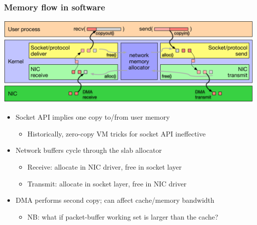 \begin{frame}
  \frametitle{Memory flow in software}

  \begin{center}
    \includegraphics[width=\textwidth]{../../figures/network-memory-flow.pdf}
  \end{center}

  \pause

  \begin{itemize}
    \item Socket API implies one copy to/from user memory
    \begin{itemize}
      \item Historically, zero-copy VM tricks for socket API ineffective
    \end{itemize}

    \pause

    \item Network buffers cycle through the slab allocator
    \begin{itemize}
      \item Receive: allocate in NIC driver, free in socket layer
      \item Transmit: allocate in socket layer, free in NIC driver
    \end{itemize}

    \pause

    \item DMA performs second copy; can affect cache/memory bandwidth
    \begin{itemize}
      \item NB: what if packet-buffer working set is larger than the cache?
    \end{itemize}
  \end{itemize}
\end{frame}

